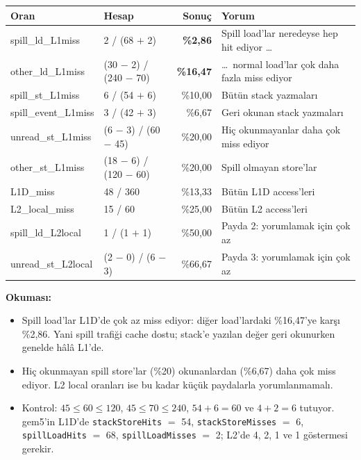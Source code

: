 \documentclass[10pt,a4paper]{article}
\newcommand{\ct}[1]{\texttt{#1}}
\begin{document}
{\small
\begin{tabularx}{\textwidth}{@{}>{\ttfamily}l l r X@{}}
\toprule
\normalfont\textbf{Oran} & \textbf{Hesap} & \textbf{Sonu\c{c}} & \textbf{Yorum} \\
\midrule
spill\_ld\_L1miss & 2 / (68 $+$ 2) & \textbf{\%2,86} & Spill load'lar
  neredeyse hep hit ediyor \ldots \\
other\_ld\_L1miss & (30 $-$ 2) / (240 $-$ 70) & \textbf{\%16,47} & \ldots\
  normal load'lar \c{c}ok daha fazla miss ediyor \\
spill\_st\_L1miss & 6 / (54 $+$ 6) & \%10,00 & B\"ut\"un stack yazmalar{\i} \\
spill\_event\_L1miss & 3 / (42 $+$ 3) & \%6,67 & Geri okunan stack
  yazmalar{\i} \\
unread\_st\_L1miss & (6 $-$ 3) / (60 $-$ 45) & \%20,00 & Hi\c{c} okunmayanlar
  daha \c{c}ok miss ediyor \\
other\_st\_L1miss & (18 $-$ 6) / (120 $-$ 60) & \%20,00 & Spill olmayan
  store'lar \\
L1D\_miss & 48 / 360 & \%13,33 & B\"ut\"un L1D access'leri \\
L2\_local\_miss & 15 / 60 & \%25,00 & B\"ut\"un L2 access'leri \\
spill\_ld\_L2local & 1 / (1 $+$ 1) & \%50,00 & Payda 2: yorumlamak i\c{c}in \c{c}ok
  az \\
unread\_st\_L2local & (2 $-$ 0) / (6 $-$ 3) & \%66,67 & Payda 3: yorumlamak
  i\c{c}in \c{c}ok az \\
\bottomrule
\end{tabularx}
}

\textbf{Okumas{\i}:}
\begin{itemize}
\setlength{\itemsep}{1pt}\setlength{\topsep}{2pt}
\item Spill load'lar L1D'de \c{c}ok az miss ediyor: di\u{g}er load'lardaki
  \%16,47'ye kar\c{s}{\i} \%2,86. Yani spill trafi\u{g}i cache dostu; stack'e yaz{\i}lan
  de\u{g}er geri okunurken genelde h\^al\^a L1'de.
\item Hi\c{c} okunmayan spill store'lar (\%20) okunanlardan (\%6,67) daha \c{c}ok
  miss ediyor. L2 local oranlar{\i} ise bu kadar k\"u\c{c}\"uk paydalarla
  yorumlanmamal{\i}.
\item Kontrol: $45 \le 60 \le 120$, $45 \le 70 \le 240$, $54 + 6 = 60$ ve
  $4 + 2 = 6$ tutuyor. gem5'in L1D'de \ct{stackStoreHits} $=$ 54,
  \ct{stackStoreMisses} $=$ 6, \ct{spillLoadHits} $=$ 68,
  \ct{spillLoadMisses} $=$ 2; L2'de 4, 2, 1 ve 1 g\"ostermesi gerekir.
\end{itemize}
\end{document}
